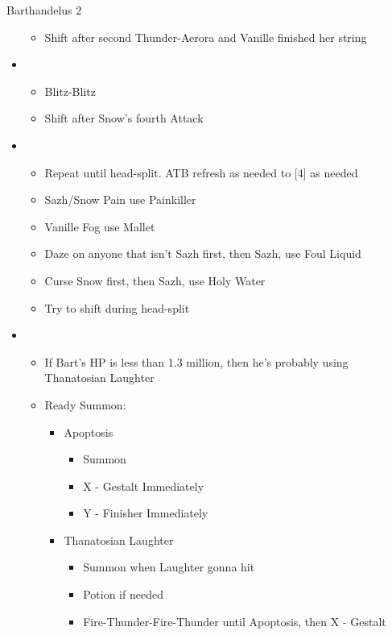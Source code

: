 \begin{battle}[2:30 $|$ 2:15]{Barthandelus 2}
\begin{multicols}{2}
\begin{itemize}
\begin{itemize}
				      \item Shift after second Thunder-Aerora and Vanille finished her string
			      \end{itemize}
			\item \fourth
			      \begin{itemize}
				      \item Blitz-Blitz
				      \item Shift after Snow's fourth Attack
			      \end{itemize}
			\item \sixth
			      \begin{itemize}
				      \item Repeat until head-split. ATB refresh as needed to [4] as needed
				      \item Sazh/Snow Pain use Painkiller
				      \item Vanille Fog use Mallet
				      \item Daze on anyone that isn't Sazh first, then Sazh, use Foul Liquid
				      \item Curse Snow first, then Sazh, use Holy Water
				      \item Try to shift during head-split
			      \end{itemize}
			\item \fifth
			      \begin{itemize}
				      \item If Bart's HP is less than 1.3 million, then he's probably using Thanatosian Laughter
				      \item Ready Summon:
				            \begin{itemize}
					            \item Apoptosis
					                  \begin{itemize}
						                  \item Summon
						                  \item X - Gestalt Immediately
						                  \item Y - Finisher Immediately
					                  \end{itemize}
					            \item Thanatosian Laughter
					                  \begin{itemize}
						                  \item Summon when Laughter gonna hit
						                  \item Potion if needed
						                  \item Fire-Thunder-Fire-Thunder until Apoptosis, then X - Gestalt

\end{itemize}
\end{itemize}
\end{itemize}
\end{itemize}
\end{multicols}
\end{battle}
